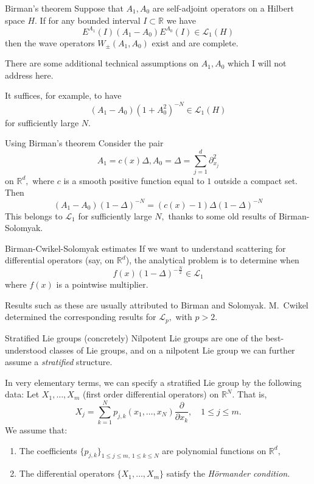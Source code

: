 \documentclass{beamer}
\numberwithin{equation}{section}
\theoremstyle{plain}
\theoremstyle{plain}
\theoremstyle{definition}
\theoremstyle{plain}
\theoremstyle{plain}
\theoremstyle{definition}
\newcommand{\Rl}{\mathbb{R}}
\newcommand{\Lc}{\mathcal{L}}
\begin{document}
\begin{frame}{Birman's theorem}
  Suppose that $A_1,A_0$ are self-adjoint operators on a Hilbert space $H.$ If for any bounded interval $I\subset \Rl$ we have
  \[
    E^{A_1}(I)(A_1-A_0)E^{A_0}(I) \in \Lc_1(H)
  \]
  then the wave operators $W_{\pm}(A_1,A_0)$ exist and are complete.\\\pause

  {\color{red} There are some additional technical assumptions on $A_1,A_0$ which I will not address here.}\\ \pause

  It suffices, for example, to have
  \[
    (A_1-A_0)(1+A_0^2)^{-N} \in \Lc_1(H)
  \]
  for sufficiently large $N.$
\end{frame}

\begin{frame}{Using Birman's theorem}
  Consider the pair
  \[
      A_1 =c(x)\Delta, A_0 = \Delta = \sum_{j=1}^d \partial_{x_j}^2
  \]
  on $\Rl^d,$ where $c$ is a smooth positive function equal to $1$ outside a compact set. Then
  \[
    (A_1-A_0)(1-\Delta)^{-N} =(c(x)-1)\Delta (1-\Delta)^{-N}
  \]
  This belongs to $\Lc_1$ for sufficiently large $N,$ thanks to some old results of Birman-Solomyak.
\end{frame}

\begin{frame}{Birman-Cwikel-Solomyak estimates}
  If we want to understand scattering for differential operators (say, on $\Rl^d$), the analytical problem is to determine when
  \[
    f(x)(1-\Delta)^{-\frac{N}{2}} \in \Lc_1
  \]
  where $f(x)$ is a pointwise multiplier.

  Results such as these are usually attributed to Birman and Solomyak. M.~Cwikel determined the corresponding results for $\Lc_p,$ with $p>2.$
\end{frame}

\begin{frame}{Stratified Lie groups (concretely)}
  Nilpotent Lie groups are one of the best-understood classes of Lie groups, and on a nilpotent Lie group we can further assume a \emph{stratified} structure.

  In very elementary terms, we can specify a stratified Lie group by the following data: Let $X_1,\ldots,X_m$ (first order differential operators) on $\Rl^N.$ That is,
  \[
      X_j = \sum_{k=1}^N p_{j,k}(x_1,\ldots,x_N)\frac{\partial}{\partial x_k},\quad 1\leq j \leq m.
  \]
  We assume that:
  \begin{enumerate}[{\rm (i)}]
    \item{} The coefficients $\{p_{j,k}\}_{1\leq j\leq m,\, 1\leq k\leq N}$ are polynomial functions on $\Rl^d,$
    \item{} The differential operators $\{X_1,\ldots,X_m\}$ satisfy the \emph{H\"{o}rmander condition}.
  \end{enumerate}
\end{frame}
\end{document}
